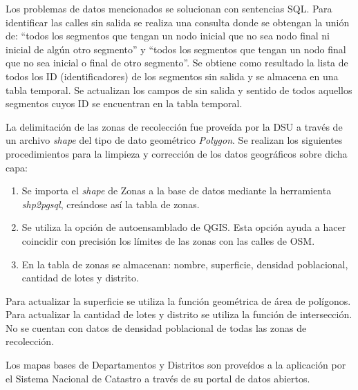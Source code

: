 Los problemas de datos mencionados se solucionan con sentencias SQL. Para identificar las calles sin salida se realiza una consulta donde se obtengan la unión de: ``todos los segmentos que tengan un nodo inicial que no sea nodo final ni inicial de algún otro segmento'' y ``todos los segmentos que tengan un nodo final que no sea inicial o final de otro segmento''. Se obtiene como resultado la lista de todos los ID (identificadores) de los segmentos sin salida y se almacena en una tabla temporal. Se actualizan los campos de sin salida y sentido de todos aquellos segmentos cuyos ID se encuentran en la tabla temporal.

La delimitación de las zonas de recolección fue proveída por la DSU a través de un archivo \textit{shape} del tipo de dato geométrico \textit{Polygon}. Se realizan los siguientes procedimientos para la limpieza y corrección de los datos geográficos sobre dicha capa:

\begin{enumerate}
\item Se importa el \textit{shape} de Zonas a la base de datos mediante la herramienta \textit{shp2pgsql}, creándose así la tabla de zonas.
\item Se utiliza la opción de autoensamblado de QGIS. Esta opción ayuda a hacer coincidir con precisión los límites de las zonas con las calles de OSM.
\item En la tabla de zonas se almacenan: nombre, superficie, densidad poblacional, cantidad de lotes y distrito.
\end{enumerate}

Para actualizar la superficie se utiliza la función geométrica de área de polígonos. Para actualizar la cantidad de lotes y distrito se utiliza la función de intersección. No se cuentan con datos de densidad poblacional de todas las zonas de recolección.

Los mapas bases de Departamentos y Distritos son proveídos a la aplicación por el Sistema Nacional de Catastro a través de su portal de datos abiertos.

